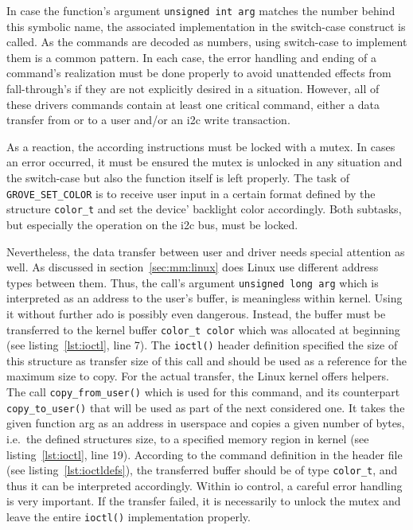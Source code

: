 %
In case the function's argument \texttt{unsigned int arg} matches the number behind this symbolic name, the associated implementation in the switch-case construct is called.
As the commands are decoded as numbers, using switch-case to implement them is a common pattern.
In each case, the error handling and ending of a command's realization must be done properly to avoid unattended effects from fall-through's if they are not explicitly desired in a situation.
However, all of these drivers commands contain at least one critical command, either a data transfer from or to a user and/or an \ac{i2c} write transaction.

As a reaction, the according instructions must be locked with a mutex.
In cases an error occurred, it must be ensured the mutex is unlocked in any situation and the switch-case but also the function itself is left properly.
The task of \texttt{GROVE_SET_COLOR} is to receive user input in a certain format defined by the structure \texttt{color_t} and set the device' backlight color accordingly.
Both subtasks, but especially the operation on the \ac{i2c} bus, must be locked.

Nevertheless, the data transfer between user and driver needs special attention as well.
As discussed in section~\ref{sec:mm:linux} does Linux use different address types between them.
Thus, the call's argument \texttt{unsigned long arg} which is interpreted as an address to the user's buffer, is meaningless within kernel.
Using it without further ado is possibly even dangerous.
Instead, the buffer must be transferred to the kernel buffer \texttt{color_t color} which was allocated at beginning (see listing~\ref{lst:ioctl}, line 7).
The \texttt{ioctl()} header definition specified the size of this structure as transfer size of this call and should be used as a reference for the maximum size to copy.
For the actual transfer, the Linux kernel offers helpers.
The call \texttt{copy_from_user()} which is used for this command, and its counterpart \texttt{copy_to_user()} that will be used as part of the next considered one.
It takes the given function arg as an address in userspace and copies a given number of bytes, i.e.\ the defined structures size, to a specified memory region in kernel (see listing~\ref{lst:ioctl}, line 19).
According to the command definition in the header file (see listing~\ref{lst:ioctldefs}), the transferred buffer should be of type \texttt{color_t}, and thus it can be interpreted accordingly.
Within \ac{io} control, a careful error handling is very important.
If the transfer failed, it is necessarily to unlock the mutex and leave the entire \texttt{ioctl()} implementation properly.

